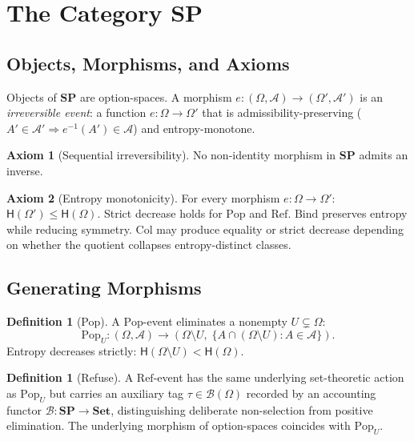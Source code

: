\documentclass[12pt,a4paper]{article}
\theoremstyle{definition}
\newtheorem{definition}[theorem]{Definition}
\newtheorem{axiom}{Axiom}
\theoremstyle{remark}
\newcommand{\Ent}{\ensuremath{\mathsf{H}}}
\newcommand{\SP}{\mathbf{SP}}
\newcommand{\Pop}{\ensuremath{\mathrm{Pop}}}
\newcommand{\RefOp}{\ensuremath{\mathrm{Ref}}}
\newcommand{\Bind}{\ensuremath{\mathrm{Bind}}}
\newcommand{\Col}{\ensuremath{\mathrm{Col}}}
\begin{document}
\section{The Category \texorpdfstring{$\SP$}{SP}}
\label{sec:sp}

\subsection{Objects, Morphisms, and Axioms}

Objects of $\SP$ are option-spaces. A morphism $e:(\Omega,\mathcal{A})\to
(\Omega',\mathcal{A}')$ is an \emph{irreversible event}: a function $e:\Omega\to\Omega'$
that is admissibility-preserving ($A'\in\mathcal{A}'\Rightarrow e^{-1}(A')\in\mathcal{A}$)
and entropy-monotone.

\begin{axiom}[Sequential irreversibility]
\label{ax:irrev}
No non-identity morphism in $\SP$ admits an inverse.
\end{axiom}

\begin{axiom}[Entropy monotonicity]
\label{ax:entropy}
For every morphism $e:\Omega\to\Omega'$: $\Ent(\Omega')\le\Ent(\Omega)$.
Strict decrease holds for $\Pop$ and $\RefOp$. $\Bind$ preserves entropy while
reducing symmetry. $\Col$ may produce equality or strict decrease depending on
whether the quotient collapses entropy-distinct classes.
\end{axiom}

\subsection{Generating Morphisms}

\begin{definition}[Pop]
\label{def:pop}
A $\Pop$-event eliminates a nonempty $U\subsetneq\Omega$:
\[
  \Pop_U : (\Omega,\mathcal{A}) \longrightarrow
  (\Omega\setminus U,\;\{A\cap(\Omega\setminus U):A\in\mathcal{A}\}).
\]
Entropy decreases strictly: $\Ent(\Omega\setminus U)<\Ent(\Omega)$.
\end{definition}

\begin{definition}[Refuse]
\label{def:ref}
A $\RefOp$-event has the same underlying set-theoretic action as $\Pop_U$ but carries
an auxiliary tag $\tau\in\mathcal{B}(\Omega)$ recorded by an accounting functor
$\mathcal{B}:\SP\to\mathbf{Set}$, distinguishing deliberate non-selection from
positive elimination. The underlying morphism of option-spaces coincides with $\Pop_U$.
\end{definition}
\end{document}
